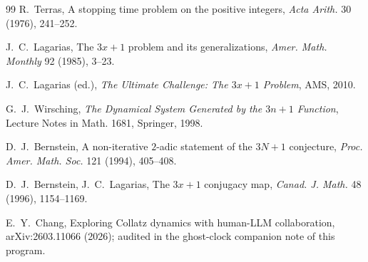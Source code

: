 \documentclass[11pt]{article}
\begin{document}
\begin{thebibliography}{99}
 R.~Terras, A stopping time problem on the positive
integers, \emph{Acta Arith.} 30 (1976), 241--252.

 J.~C.~Lagarias, The $3x+1$ problem and its
generalizations, \emph{Amer. Math. Monthly} 92 (1985), 3--23.

 J.~C.~Lagarias (ed.), \emph{The Ultimate
Challenge: The $3x+1$ Problem}, AMS, 2010.

 G.~J.~Wirsching, \emph{The Dynamical System
Generated by the $3n+1$ Function}, Lecture Notes in Math. 1681,
Springer, 1998.

 D.~J.~Bernstein, A non-iterative $2$-adic
statement of the $3N+1$ conjecture, \emph{Proc. Amer. Math. Soc.} 121
(1994), 405--408.

 D.~J.~Bernstein, J.~C.~Lagarias, The
$3x+1$ conjugacy map, \emph{Canad. J. Math.} 48 (1996), 1154--1169.

 E.~Y.~Chang, Exploring Collatz dynamics with
human-LLM collaboration, arXiv:2603.11066 (2026); audited in the
ghost-clock companion note of this program.

\end{thebibliography}
\end{document}
